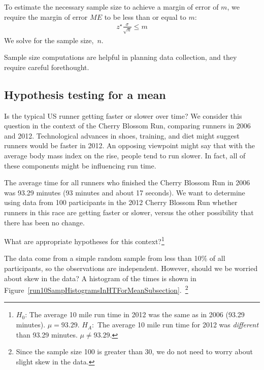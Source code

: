 \begin{termBox}{
To estimate the necessary sample size to achieve a margin of error of $m$, we require the margin of error $ME$ to be less than or equal to $m$:
\begin{align*}
z^{\star}\frac{\sigma}{\sqrt{n}}\leq m
\end{align*}
We solve for the sample size,~$n$.}
\end{termBox}

Sample size computations are helpful in planning data collection, and they require careful forethought. 




\subsection{Hypothesis testing for a mean}
\label{oneSampleTTests}


Is the typical US runner getting faster or slower over time? We consider this question in the context of the Cherry Blossom Run, comparing runners in 2006 and 2012. Technological advances in shoes, training, and diet might suggest runners would be faster in 2012. An opposing viewpoint might say that with the average body mass index on the rise, people tend to run slower. In fact, all of these components might be influencing run time.

The average time for all runners who finished the Cherry Blossom Run in 2006 was 93.29 minutes (93 minutes and about 17 seconds). We want to determine using data from 100 participants in the 2012 Cherry Blossom Run whether runners in this race are getting faster or slower, versus the other possibility that there has been no change.

\begin{exercise}
What are appropriate hypotheses for this context?\footnote{$H_0$: The average 10 mile run time in 2012 was the same as in 2006 (93.29 minutes). $\mu = 93.29$. $H_A$:~The average 10 mile run time for 2012 was \emph{different} than 93.29 minutes. $\mu \neq 93.29$.}
\end{exercise}

\begin{exercise}
The data come from a simple random sample from less than 10\% of all participants, so the observations are independent. However, should we be worried about skew in the data? A histogram of the times is shown in Figure~\ref{run10SampHistogramsInHTForMeanSubsection}.~\footnote{Since the sample size 100 is greater than 30, we do not need to worry about slight skew in the data.}
\end{exercise}

